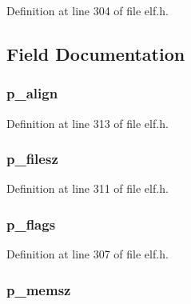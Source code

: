 Definition at line 304 of file elf.\-h.



\subsection{Field Documentation}
\hypertarget{struct_elf64___phdr_a306c8ed70f923f594559202b1c741914}{
\subsubsection[{p\-\_\-align}]{ p\-\_\-align}}\label{struct_elf64___phdr_a306c8ed70f923f594559202b1c741914}


Definition at line 313 of file elf.\-h.

\hypertarget{struct_elf64___phdr_ae9d6a504ec878bf7493f6b6f858d3107}{
\subsubsection[{p\-\_\-filesz}]{ p\-\_\-filesz}}\label{struct_elf64___phdr_ae9d6a504ec878bf7493f6b6f858d3107}


Definition at line 311 of file elf.\-h.

\hypertarget{struct_elf64___phdr_a2c6d96dc1a597b942fc2dc7ad5c2251d}{
\subsubsection[{p\-\_\-flags}]{ p\-\_\-flags}}\label{struct_elf64___phdr_a2c6d96dc1a597b942fc2dc7ad5c2251d}


Definition at line 307 of file elf.\-h.

\hypertarget{struct_elf64___phdr_a0e0391286a8c7d60a30acdfe4ba66afa}{
\subsubsection[{p\-\_\-memsz}]{ p\-\_\-memsz}}\label{struct_elf64___phdr_a0e0391286a8c7d60a30acdfe4ba66afa}


